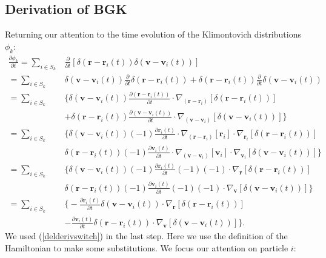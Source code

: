 \documentclass{article}
\begin{document}
\subsection{Derivation of BGK}
Returning our attention to the time evolution of the Klimontovich distributions $\phi_k$:
\begin{align*}
\frac{\partial \phi_k}{\partial t}=\sum_{i\in S_k}& \frac{\partial}{\partial t}\left[\delta(\mathbf{r}-\mathbf{r}_i(t))\delta(\mathbf{v}-\mathbf{v}_i(t))\right]\\
=\sum_{i\in S_k}& \delta(\mathbf{v}-\mathbf{v}_i(t))\frac{\partial}{\partial t}\delta(\mathbf{r}-\mathbf{r}_i(t))+\delta(\mathbf{r}-\mathbf{r}_i(t))\frac{\partial }{\partial t}\delta(\mathbf{v}-\mathbf{v}_i(t))\\
=\sum_{i\in S_k}&\bigg\{\delta(\mathbf{v}-\mathbf{v}_i(t))\frac{\partial(\mathbf{r}-\mathbf{r}_i(t))}{\partial t}\cdot\nabla_{(\mathbf{r}-\mathbf{r}_i)}[\delta(\mathbf{r}-\mathbf{r}_i(t))]\\
&+\delta(\mathbf{r}-\mathbf{r}_i(t))\frac{\partial(\mathbf{v}-\mathbf{v}_i(t))}{\partial t}\cdot\nabla_{(\mathbf{v}-\mathbf{v}_i)}[\delta(\mathbf{v}-\mathbf{v}_i(t))]\bigg\}\\
=\sum_{i\in S_k}&\bigg\{\delta(\mathbf{v}-\mathbf{v}_i(t))(-1)\frac{\partial \mathbf{r}_i(t)}{\partial t}\cdot\nabla_{(\mathbf{r}-\mathbf{r}_i)}[\mathbf{r}_i]\cdot\nabla_{\mathbf{r}_i}[\delta(\mathbf{r}-\mathbf{r}_i(t))]\\
&\delta(\mathbf{r}-\mathbf{r}_i(t))(-1)\frac{\partial \mathbf{v}_i(t)}{\partial t}\cdot\nabla_{(\mathbf{v}-\mathbf{v}_i)}[\mathbf{v}_i]\cdot\nabla_{\mathbf{v}_i}[\delta(\mathbf{v}-\mathbf{v}_i(t))]\bigg\}\\
=\sum_{i\in S_k}&\bigg\{\delta(\mathbf{v}-\mathbf{v}_i(t))(-1)\frac{\partial \mathbf{r}_i(t)}{\partial t}(-1)(-1)\cdot\nabla_{\mathbf{r}}[\delta(\mathbf{r}-\mathbf{r}_i(t))]\\
&\delta(\mathbf{r}-\mathbf{r}_i(t))(-1)\frac{\partial \mathbf{v}_i(t)}{\partial t}(-1)(-1)\cdot\nabla_{\mathbf{v}}[\delta(\mathbf{v}-\mathbf{v}_i(t))]\bigg\}\\
=\sum_{i\in S_k}&\bigg\{-\frac{\partial \mathbf{r}_i(t)}{\partial t}\delta(\mathbf{v}-\mathbf{v}_i(t))\cdot \nabla_\mathbf{r}[\delta(\mathbf{r}-\mathbf{r}_i(t))]\\&-\frac{\partial \mathbf{v}_i(t)}{\partial t}\delta(\mathbf{r}-\mathbf{r}_i(t))\cdot \nabla_\mathbf{v}[\delta(\mathbf{v}-\mathbf{v}_i(t))]\bigg\}.
\end{align*}We used (\ref{delderivswitch}) in the last step. Here we use the definition of the Hamiltonian to make some substitutions. We focus our attention on particle $i$:
\end{document}

